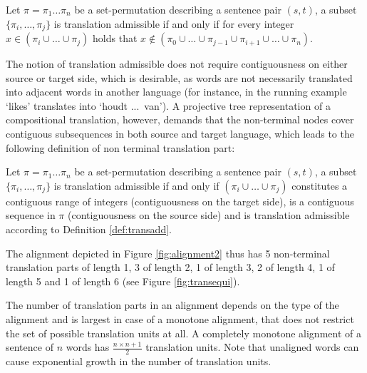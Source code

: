 \begin{definition}\label{def:transadd}
Let $\pi = \pi_1 \ldots \pi_n$ be a set-permutation describing a sentence pair $(s,t)$, a subset $\{\pi_i,\ldots,\pi_j\}$ is translation admissible if and only if for every integer $x \in (\pi_i\cup \ldots \cup\pi_j)$ holds that $x \notin (\pi_0\cup \ldots \cup \pi_{j-1} \cup \pi_{i+1}\cup\ldots\cup \pi_n)$.
\end{definition}

\noindent The notion of translation admissible does not require contiguousness on either source or target side, which is desirable, as words are not necessarily translated into adjacent words in another language (for instance, in the running example `likes' translates into `houdt ...~van'). A projective tree representation of a compositional translation, however, demands that the non-terminal nodes cover contiguous subsequences in both source and target language, which leads to the following definition of non terminal translation part:

\begin{definition}\label{def:transpart}
Let $\pi = \pi_1 \ldots \pi_n$ be a set-permutation describing a sentence pair $(s,t)$, a subset $\{\pi_i,\ldots,\pi_j\}$ is translation admissible if and only if $(\pi_i\cup \ldots \cup \pi_j)$ constitutes a contiguous range of integers (contiguousness on the target side), is a contiguous sequence in $\pi$ (contiguousness on the source side) and is translation admissible according to Definition \ref{def:transadd}.
\end{definition}

\noindent The alignment depicted in Figure \ref{fig:alignment2} thus has 5 non-terminal translation parts of length 1, 3 of length 2, 1 of length 3, 2 of length 4, 1 of length 5 and 1 of length 6 (see Figure \ref{fig:transequi}).

The number of translation parts in an alignment depends on the type of the alignment and is largest in case of a monotone alignment, that does not restrict the set of possible translation units at all. A completely monotone alignment of a sentence of $n$ words has $\frac{n\times n+1}{2}$ translation units. Note that unaligned words can cause exponential growth in the number of translation units.

